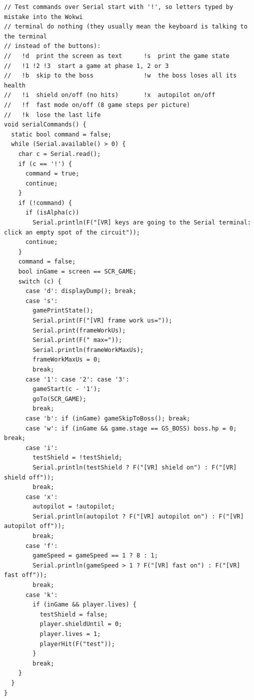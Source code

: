 \documentclass[11pt,a4paper]{article}
\begin{document}
\begin{lstlisting}[language=Arduino]
// Test commands over Serial start with '!', so letters typed by mistake into the Wokwi
// terminal do nothing (they usually mean the keyboard is talking to the terminal
// instead of the buttons):
//   !d  print the screen as text      !s  print the game state
//   !1 !2 !3  start a game at phase 1, 2 or 3
//   !b  skip to the boss              !w  the boss loses all its health
//   !i  shield on/off (no hits)       !x  autopilot on/off
//   !f  fast mode on/off (8 game steps per picture)
//   !k  lose the last life
void serialCommands() {
  static bool command = false;
  while (Serial.available() > 0) {
    char c = Serial.read();
    if (c == '!') {
      command = true;
      continue;
    }
    if (!command) {
      if (isAlpha(c))
        Serial.println(F("[VR] keys are going to the Serial terminal: click an empty spot of the circuit"));
      continue;
    }
    command = false;
    bool inGame = screen == SCR_GAME;
    switch (c) {
      case 'd': displayDump(); break;
      case 's':
        gamePrintState();
        Serial.print(F("[VR] frame work us="));
        Serial.print(frameWorkUs);
        Serial.print(F(" max="));
        Serial.println(frameWorkMaxUs);
        frameWorkMaxUs = 0;
        break;
      case '1': case '2': case '3':
        gameStart(c - '1');
        goTo(SCR_GAME);
        break;
      case 'b': if (inGame) gameSkipToBoss(); break;
      case 'w': if (inGame && game.stage == GS_BOSS) boss.hp = 0; break;
      case 'i':
        testShield = !testShield;
        Serial.println(testShield ? F("[VR] shield on") : F("[VR] shield off"));
        break;
      case 'x':
        autopilot = !autopilot;
        Serial.println(autopilot ? F("[VR] autopilot on") : F("[VR] autopilot off"));
        break;
      case 'f':
        gameSpeed = gameSpeed == 1 ? 8 : 1;
        Serial.println(gameSpeed > 1 ? F("[VR] fast on") : F("[VR] fast off"));
        break;
      case 'k':
        if (inGame && player.lives) {
          testShield = false;
          player.shieldUntil = 0;
          player.lives = 1;
          playerHit(F("test"));
        }
        break;
    }
  }
}


\end{lstlisting}
\end{document}
